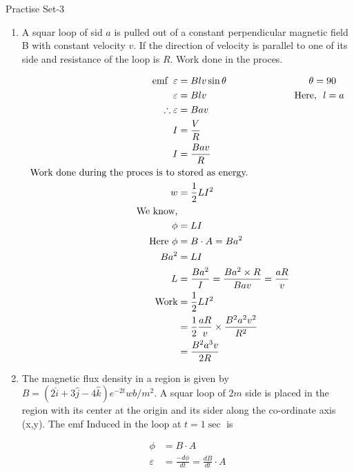 \newpage
\begin{abox}
	Practise Set-3
\end{abox}
\begin{enumerate}[ label=\color{ocre}\textbf{\arabic*.}]
	\item A squar loop of sid $a$ is pulled out of a constant perpendicular magnetic field B with constant velocity $v$. If the direction of velocity is parallel to one of its side and resistance of the loop is $R$. Work done in the proces.\\
	\begin{answer}
		\begin{align*}
		\operatorname{emf}\  \varepsilon&= Blv\sin\theta \hspace{3cm} \theta=90\\
		\varepsilon&=B l v  \hspace{3.2cm} \text{Here, }\ l=a\\
		\therefore \varepsilon&=B a v\\
		I&=\frac{V}{R}\\
		I&=\frac{B a v}{R}\\
		\text{Work done during the proces is to }&\text{stored as energy.}\\
		w&=\frac{1}{2} L I^{2}\\
		\text{We know,}\\
		\phi&=L I\\
		\text{Here } \phi&=B \cdot A=B  a^{2}\\
		B a^{2}&=L I\\
		L&=\frac{B a^{2}}{I}=\frac{B a^{2} \times R}{B a v}=\frac{a R}{v}\\
		\text{Work} &=\frac{1}{2} L I^{2}\\
		&=\frac{1}{2} \frac{a R}{v} \times \frac{B^{2} a^{2} v^{2}}{R^{2}}\\
		&=\frac{B^{2} a^{3} v}{2 R}
		\end{align*}
	\end{answer}
	\item The magnetic flux density in a region is given by $B=(2\hat{i}+3 \hat{j} -4 \hat{k}) e^{-2 t} w b / m^{2}$. A squar loop of $2 m$ side is placed in the region with its center at the origin and its sider along the co-ordinate axis (x,y). The emf Induced in the loop at $t=1 \sec$ is\\
	\begin{answer}
		\begin{align*}
		\phi&=B \cdot A\\
		\varepsilon&=\frac{-d \phi}{d t}=\frac{d B}{d t} \cdot A\\

\end{align*}
\end{answer}
\end{enumerate}
